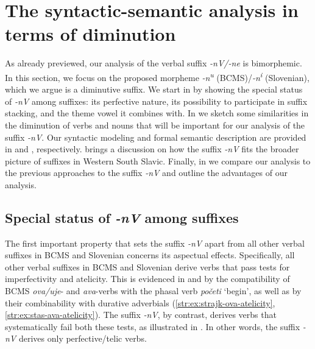 \documentclass[output=paper,colorlinks,citecolor=brown]{langscibook}
\begin{document}
\section{The syntactic-semantic analysis in terms of diminution} \label{str:sect:syntactic-semantic analysis}

As already previewed, our analysis of the verbal suffix \textit{-nV/-ne} is bimorphemic. In this section, we focus on the proposed morpheme \textit{-n\textsuperscript{u}} (BCMS)/\textit{-n\textsuperscript{i}} (Slovenian), which we argue is a diminutive suffix. We start in  by showing the special status of \textit{-nV} among suffixes: its perfective nature, its possibility to participate in suffix stacking, and the theme vowel it combines with. In  we sketch some similarities in the diminution of verbs and nouns that will be important for our analysis of the suffix \textit{\textit{-nV}}. Our syntactic modeling and formal semantic description are provided in  and , respectively.  brings a discussion on how the suffix \textit{-nV} fits the broader picture of suffixes in Western South Slavic. Finally, in  we compare our analysis to the previous approaches to the suffix \textit{-nV} and outline the advantages of our analysis.

\subsection{Special status of \textit{-nV} among suffixes} \label{str:subsect:Special status of nu among suffixes}

The first important property that sets the suffix \textit{-nV} apart from all other verbal suffixes in BCMS and Slovenian concerns its aspectual effects. Specifically, all other verbal suffixes in BCMS and Slovenian derive verbs that pass tests for imperfectivity and atelicity. This is evidenced in  and  by the compatibility of BCMS \textit{ova/uje}- and \textit{ava}-verbs with the phasal verb \textit{početi} `begin', as well as by their combinability with durative adverbials (\ref{str:ex:strajk-ova-atelicity}, \ref{str:ex:stas-ava-atelicity}). The suffix \textit{-nV}, by contrast, derives verbs that systematically fail both these tests, as illustrated in . In other words, the suffix \textit{-nV} derives only perfective/telic verbs. 
\end{document}
